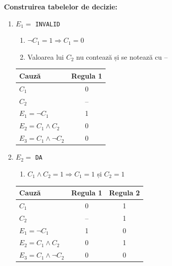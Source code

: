\documentclass[11pt,a4paper]{article}
\begin{document}
\textbf{Construirea tabelelor de decizie:}
\begin{enumerate}[label={\arabic*.},ref=\arabic*,leftmargin=*]
\item $E_1=$ \texttt{INVALID}
  \begin{enumerate}[label={\theenumi.\arabic*.},leftmargin=*,nosep]
  \item $\neg C_1=1 \Rightarrow C_1=0$
  \item Valoarea lui $C_2$ nu contează și se notează cu --
  \end{enumerate}
  \begin{center}
  \begin{tabular}{@{}lc@{}}
  \toprule
  Cauză & Regula 1 \\
  \midrule
  $C_1$ & 0 \\
  $C_2$ & -- \\
  \midrule
  $E_1=\neg C_1$ & 1 \\
  $E_2=C_1\land C_2$ & 0 \\
  $E_3=C_1\land\neg C_2$ & 0 \\
  \bottomrule
  \end{tabular}
  \end{center}

\item $E_2=$ \texttt{DA}
  \begin{enumerate}[label={\theenumi.\arabic*.},leftmargin=*,nosep]
  \item $C_1\land C_2=1 \Rightarrow C_1=1$ și $C_2=1$
  \end{enumerate}
  \begin{center}
  \begin{tabular}{@{}lcc@{}}
  \toprule
  Cauză & Regula 1 & Regula 2 \\
  \midrule
  $C_1$ & 0 & 1 \\
  $C_2$ & -- & 1 \\
  \midrule
  $E_1=\neg C_1$ & 1 & 0 \\
  $E_2=C_1\land C_2$ & 0 & 1 \\
  $E_3=C_1\land\neg C_2$ & 0 & 0 \\
  \bottomrule
  \end{tabular}
  \end{center}


\end{enumerate}
\end{document}
